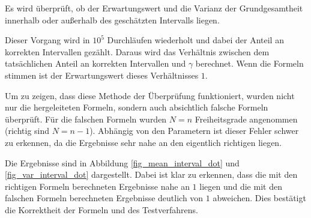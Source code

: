 \documentclass[10pt,twocolumn]{scrartcl}
\begin{document}
		Es wird überprüft, ob der Erwartungswert und die Varianz der Grundgesamtheit innerhalb oder außerhalb des geschätzten Intervalls liegen.

		Dieser Vorgang wird in $10^5$ Durchläufen wiederholt und dabei der Anteil an korrekten Intervallen gezählt. Daraus wird das Verhältnis zwischen dem tatsächlichen Anteil an korrekten Intervallen und $\gamma$ berechnet. Wenn die Formeln stimmen ist der Erwartungswert dieses Verhältnisses $1$.

		Um zu zeigen, dass diese Methode der Überprüfung funktioniert, wurden nicht nur die hergeleiteten Formeln, sondern auch absichtlich falsche Formeln überprüft. Für die falschen Formeln wurden $N = n$ Freiheitsgrade angenommen (richtig sind $N = n-1$). Abhängig von den Parametern ist dieser Fehler schwer zu erkennen, da die Ergebnisse sehr nahe an den eigentlich richtigen liegen.

		Die Ergebnisse sind in Abbildung \ref{fig_mean_interval_dot} und \ref{fig_var_interval_dot} dargestellt. Dabei ist klar zu erkennen, dass die mit den richtigen Formeln berechneten Ergebnisse nahe an $1$ liegen und die mit den falschen Formeln berechneten Ergebnisse deutlich von $1$ abweichen. Dies bestätigt die Korrektheit der Formeln und des Testverfahrens.
\end{document}
